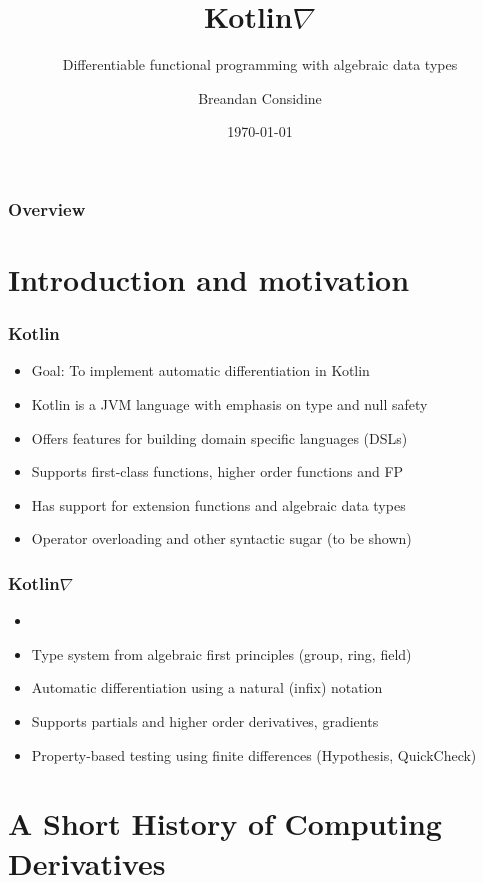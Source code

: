 \documentclass{beamer}
\title{Kotlin\texorpdfstring{$\nabla$}{}}
\subtitle{Differentiable functional programming with algebraic data types}
\author{Breandan Considine}
\institute[UdeM]{
Universit\'e de Montr\'eal \\
\medskip
\textit{breandan.considine@umontreal.ca}
}
\date{\today}
\begin{document}
    \begin{frame}
        \titlepage
    \end{frame}

    \begin{frame}
        \frametitle{Overview}
        \tableofcontents
    \end{frame}

    \section{Introduction and motivation}\label{sec:first-section}

    \begin{frame}
        \frametitle{Kotlin}
        \begin{itemize}
            \item Goal: To implement automatic differentiation in Kotlin
            \item Kotlin is a JVM language with emphasis on type and null safety
            \item Offers features for building domain specific languages (DSLs)
            \item Supports first-class functions, higher order functions and FP
            \item Has support for extension functions and algebraic data types
            \item Operator overloading and other syntactic sugar (to be shown)
        \end{itemize}
    \end{frame}



    \begin{frame}
        \frametitle{Kotlin\texorpdfstring{$\nabla$}{}}
        \begin{itemize}
            \item
            \item Type system from algebraic first principles (group, ring, field)
            \item Automatic differentiation using a natural (infix) notation
            \item Supports partials and higher order derivatives, gradients
            \item Property-based testing using finite differences (Hypothesis, QuickCheck)
        \end{itemize}
    \end{frame}

    \section{A Short History of Computing Derivatives}\label{sec:second-section}
\end{document}
